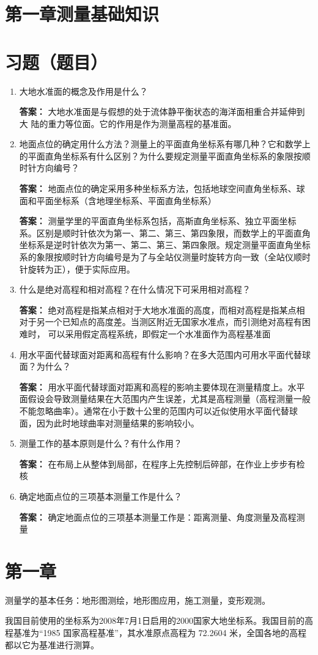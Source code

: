 \documentclass[12pt,a4paper]{article}
\newcounter{question}
\newenvironment{questions}{
    \setcounter{question}{0}
    \section*{习题（题目）}
    \begin{enumerate}[leftmargin=1.5em,label={\arabic*．}]
}{
    \end{enumerate}
}
\newcommand{\answer}[1]{\par\noindent\textbf{答案：} #1\par\vspace{1em}}
\begin{document}
\newpage

\section*{第一章\quad 测量基础知识}
\begin{questions}
    \item 大地水准面的概念及作用是什么？
    \answer{大地水准面是与假想的处于流体静平衡状态的海洋面相重合并延伸到大
陆的重力等位面。它的作用是作为测量高程的基准面。}
    \item 地面点位的确定用什么方法？测量上的平面直角坐标系有哪几种？它和数学上的平面直角坐标系有什么区别？为什么要规定测量平面直角坐标系的象限按顺时针方向编号？
    \answer{地面点位的确定采用多种坐标系方法，包括地球空间直角坐标系、球面和平面坐标系（含地理坐标系、平面直角坐标系）}
    \answer{测量学里的平面直角坐标系包括，高斯直角坐标系、独立平面坐标系。区别是顺时针依次为第一、第二、第三、第四象限，而数学上的平面直角坐标系是逆时针依次为第一、第二、第三、第四象限。规定测量平面直角坐标系的象限按顺时针方向编号是为了与全站仪测量时旋转方向一致（全站仪顺时针旋转为正），便于实际应用。}
    \item 什么是绝对高程和相对高程？在什么情况下可采用相对高程？
    \answer{绝对高程是指某点相对于大地水准面的高度，而相对高程是指某点相对于另一个已知点的高度差。当测区附近无国家水准点，而引测绝对高程有困难时，
可以采用假定高程系统，即假定一个水准面作为高程基准面}
    \item 用水平面代替球面对距离和高程有什么影响？在多大范围内可用水平面代替球面？为什么？
    \answer{用水平面代替球面对距离和高程的影响主要体现在测量精度上。水平面假设会导致测量结果在大范围内产生误差，尤其是高程测量（高程测量一般不能忽略曲率）。通常在小于数十公里的范围内可以近似使用水平面代替球面，因为此时地球曲率对测量结果的影响较小。}
    \item 测量工作的基本原则是什么？有什么作用？
    \answer{在布局上从整体到局部，在程序上先控制后碎部，在作业上步步有检核 }
    \item 确定地面点位的三项基本测量工作是什么？
    \answer{确定地面点位的三项基本测量工作是：距离测量、角度测量及高程测量}
\end{questions}

\section*{第一章}
测量学的基本任务：地形图测绘，地形图应用，施工测量，变形观测。 

我国目前使用的坐标系为2008年7月1日启用的2000国家大地坐标系。我国目前的高程基准为“1985 国家高程基准”，其水准原点高程为
72.2604 米，全国各地的高程都以它为基准进行测算。
\end{document}
